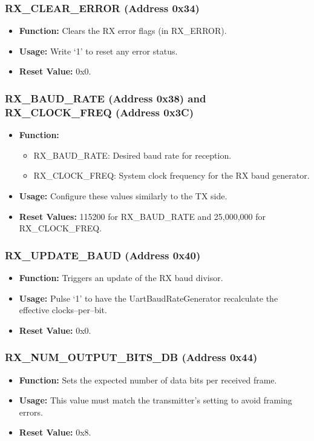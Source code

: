 \subsubsection{RX\_CLEAR\_ERROR (Address 0x34)}
\begin{itemize}[noitemsep]
    \item \textbf{Function:} Clears the RX error flags (in RX\_ERROR).
    \item \textbf{Usage:} Write ‘1’ to reset any error status.
    \item \textbf{Reset Value:} 0x0.
\end{itemize}

\subsubsection{RX\_BAUD\_RATE (Address 0x38) and RX\_CLOCK\_FREQ (Address 0x3C)}
\begin{itemize}[noitemsep]
    \item \textbf{Function:}
    \begin{itemize}
        \item RX\_BAUD\_RATE: Desired baud rate for reception.
        \item RX\_CLOCK\_FREQ: System clock frequency for the RX baud generator.
    \end{itemize}
    \item \textbf{Usage:} Configure these values similarly to the TX side.
    \item \textbf{Reset Values:} 115200 for RX\_BAUD\_RATE and 25,000,000 for RX\_CLOCK\_FREQ.
\end{itemize}

\subsubsection{RX\_UPDATE\_BAUD (Address 0x40)}
\begin{itemize}[noitemsep]
    \item \textbf{Function:} Triggers an update of the RX baud divisor.
    \item \textbf{Usage:} Pulse ‘1’ to have the UartBaudRateGenerator recalculate the effective clocks–per–bit.
    \item \textbf{Reset Value:} 0x0.
\end{itemize}

\subsubsection{RX\_NUM\_OUTPUT\_BITS\_DB (Address 0x44)}
\begin{itemize}[noitemsep]
    \item \textbf{Function:} Sets the expected number of data bits per received frame.
    \item \textbf{Usage:} This value must match the transmitter’s setting to avoid framing errors.
    \item \textbf{Reset Value:} 0x8.
\end{itemize}

